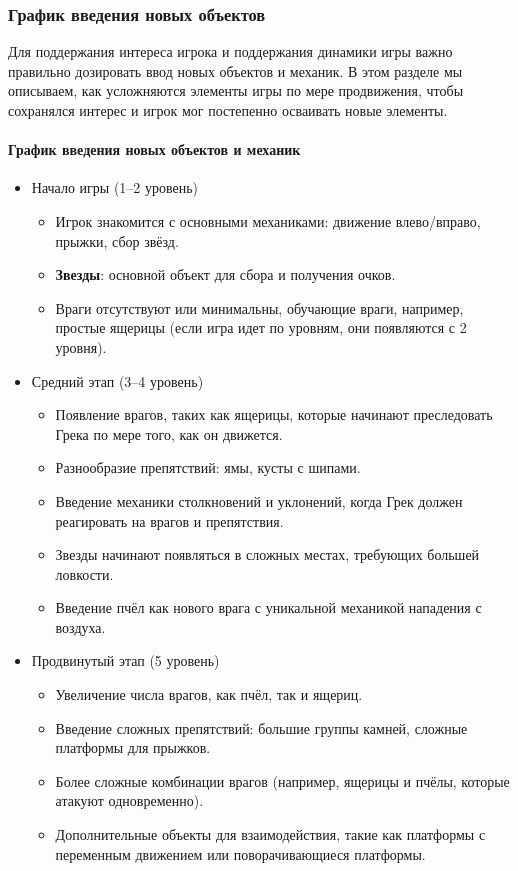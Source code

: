 \documentclass{article}
\begin{document}
\subsubsection{График введения новых объектов}
Для поддержания интереса игрока и поддержания динамики игры важно правильно дозировать ввод новых объектов и механик. В этом разделе мы описываем, как усложняются элементы игры по мере продвижения, чтобы сохранялся интерес и игрок мог постепенно осваивать новые элементы.

\paragraph{График введения новых объектов и механик}

\begin{itemize}

\item{Начало игры (1--2 уровень)}
\begin{itemize}
    \item Игрок знакомится с основными механиками: движение влево/вправо, прыжки, сбор звёзд.
    \item \textbf{Звезды}: основной объект для сбора и получения очков.
    \item Враги отсутствуют или минимальны, обучающие враги, например, простые ящерицы (если игра идет по уровням, они появляются с 2 уровня).
\end{itemize}

\item{Средний этап (3--4 уровень)}
\begin{itemize}
    \item Появление врагов, таких как ящерицы, которые начинают преследовать Грека по мере того, как он движется.
    \item Разнообразие препятствий: ямы, кусты с шипами.
    \item Введение механики столкновений и уклонений, когда Грек должен реагировать на врагов и препятствия.
    \item Звезды начинают появляться в сложных местах, требующих большей ловкости.
    \item Введение пчёл как нового врага с уникальной механикой нападения с воздуха.
\end{itemize}

\item{Продвинутый этап (5 уровень)}
\begin{itemize}
    \item Увеличение числа врагов, как пчёл, так и ящериц.
    \item Введение сложных препятствий: большие группы камней, сложные платформы для прыжков.
    \item Более сложные комбинации врагов (например, ящерицы и пчёлы, которые атакуют одновременно).
    \item Дополнительные объекты для взаимодействия, такие как платформы с переменным движением или поворачивающиеся платформы.
\end{itemize}
\end{itemize}
\end{document}
